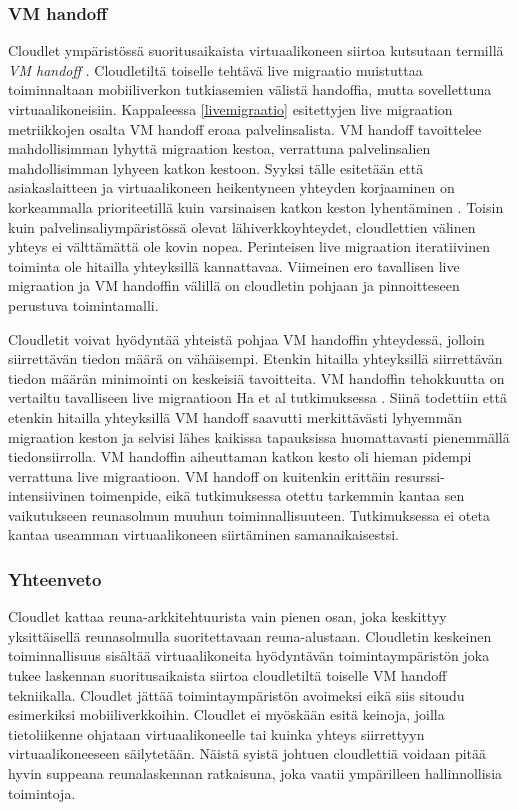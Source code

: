 \subsubsection{VM handoff} \label{vmhandoff}

Cloudlet ympäristössä suoritusaikaista virtuaalikoneen siirtoa kutsutaan termillä \textit{VM handoff} \cite{ha2015adaptive}. Cloudletiltä toiselle tehtävä live migraatio muistuttaa toiminnaltaan mobiiliverkon tutkiasemien välistä handoffia, mutta sovellettuna virtuaalikoneisiin.
Kappaleessa \ref{livemigraatio} esitettyjen live migraation metriikkojen osalta VM handoff eroaa palvelinsalista. VM handoff tavoittelee mahdollisimman lyhyttä migraation kestoa, verrattuna palvelinsalien mahdollisimman lyhyeen katkon kestoon.
Syyksi tälle esitetään että asiakaslaitteen ja virtuaalikoneen heikentyneen yhteyden korjaaminen on korkeammalla prioriteetillä kuin varsinaisen katkon keston lyhentäminen \cite{ha2015adaptive}.
Toisin kuin palvelinsaliympäristössä olevat lähiverkkoyhteydet, cloudlettien välinen yhteys ei välttämättä ole kovin nopea. 
Perinteisen live migraation iteratiivinen toiminta ole hitailla yhteyksillä kannattavaa. 
Viimeinen ero tavallisen live migraation ja VM handoffin välillä on cloudletin pohjaan ja pinnoitteseen perustuva toimintamalli.

Cloudletit voivat hyödyntää yhteistä pohjaa VM handoffin yhteydessä, jolloin siirrettävän tiedon määrä on vähäisempi. 
Etenkin hitailla yhteyksillä siirrettävän tiedon määrän minimointi on keskeisiä tavoitteita. 
VM handoffin tehokkuutta on vertailtu tavalliseen live migraatioon Ha et al tutkimuksessa \cite{ha2017you}. Siinä todettiin että etenkin hitailla yhteyksillä VM handoff saavutti merkittävästi lyhyemmän migraation keston ja selvisi lähes kaikissa tapauksissa huomattavasti pienemmällä tiedonsiirrolla. VM handoffin aiheuttaman katkon kesto oli hieman pidempi verrattuna live migraatioon. 
VM handoff on kuitenkin erittäin resurssi-intensiivinen toimenpide, eikä tutkimuksessa otettu tarkemmin kantaa sen vaikutukseen reunasolmun muuhun toiminnallisuuteen.
Tutkimuksessa ei oteta kantaa useamman virtuaalikoneen siirtäminen samanaikaisestsi. 
\subsubsection{Yhteenveto}
Cloudlet kattaa reuna-arkkitehtuurista vain pienen osan, joka keskittyy yksittäisellä reunasolmulla suoritettavaan reuna-alustaan. Cloudletin keskeinen toiminnallisuus sisältää virtuaalikoneita hyödyntävän toimintaympäristön joka tukee laskennan suoritusaikaista siirtoa cloudletiltä toiselle VM handoff tekniikalla. 
Cloudlet jättää toimintaympäristön avoimeksi eikä siis sitoudu esimerkiksi mobiiliverkkoihin.
Cloudlet ei myöskään esitä keinoja, joilla tietoliikenne ohjataan virtuaalikoneelle tai kuinka yhteys siirrettyyn virtuaalikoneeseen säilytetään. 
Näistä syistä johtuen cloudlettiä voidaan pitää hyvin suppeana reunalaskennan ratkaisuna, joka vaatii ympärilleen hallinnollisia toimintoja.
